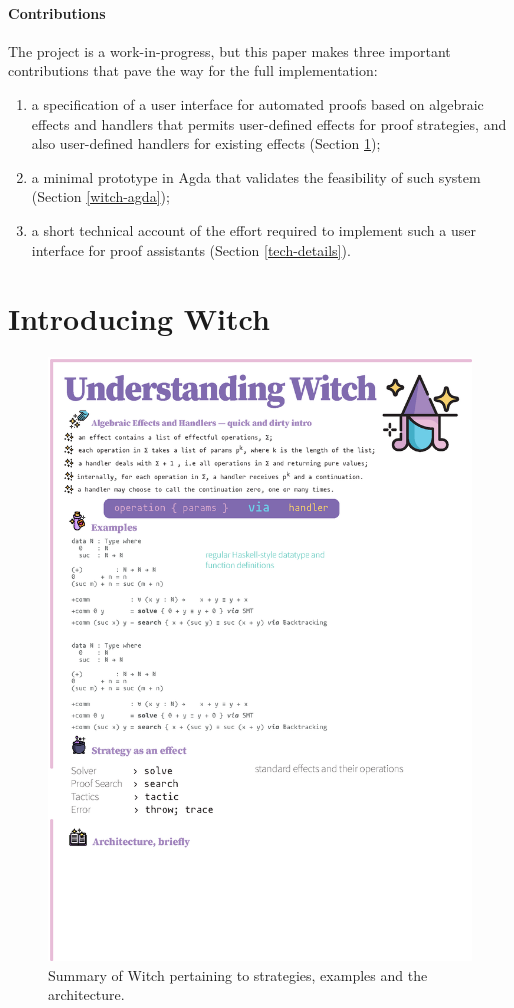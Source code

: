 \documentclass[sigconfl]{acmart}
\begin{document}
\paragraph{Contributions} The project is a work-in-progress, but this paper
makes three important contributions that pave the way for the full implementation:
\begin{enumerate}
\item a specification of a user interface for automated proofs based on
  algebraic effects and handlers that permits user-defined effects for proof
  strategies, and also user-defined handlers for existing effects (Section \ref{intro-witch});
\item a minimal prototype in Agda that validates the feasibility of such system
  (Section \ref{witch-agda});
\item a short technical account of the effort required to implement such a
  user interface for proof assistants (Section \ref{tech-details}).
\end{enumerate}

\section{Introducing Witch} \label{intro-witch}

\begin{figure}[!ht]
   \centering
    \includegraphics[height=\textheight]{image/witch.eps}
    \caption{Summary of Witch pertaining to strategies, examples
      and the architecture.}
    \label{fig:prototype}
\end{figure}
\end{document}
